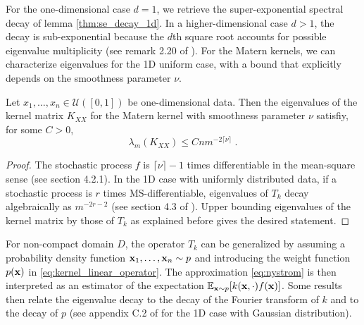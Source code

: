 \documentclass{article}
\begin{document}
For the one-dimensional case $d=1$, we retrieve the super-exponential spectral decay of lemma \ref{thm:se_decay_1d}. In a higher-dimensional case $d>1$, the decay is sub-exponential because the $d$th square root accounts for possible eigenvalue multiplicity (see remark 2.20 of \cite{schwab_karhunenloeve_2006}).
For the Matern kernels, we can characterize eigenvalues for the 1D uniform case, with a bound that explicitly depends on the smoothness parameter $\nu$.


\begin{theorem} \label{thm:matern_1d_uniform}
Let $x_1, \ldots, x_n \in \mathcal U([0, 1])$ be one-dimensional data. Then the eigenvalues of the kernel matrix $K_{XX}$ for the Matern kernel with smoothness parameter $\nu$ satisfiy, for some $C > 0$,
\begin{equation*}
    \lambda_m(K_{XX}) \le C n m^{-2\lceil \nu \rceil} \; .
\end{equation*}
\end{theorem}
\begin{proof}
The stochastic process $f$ is $\lceil \nu \rceil -1$ times differentiable in the mean-square sense (see \cite{rasmussen_gaussian_2005} section 4.2.1). In the 1D case with uniformly distributed data, if a stochastic process is $r$ times MS-differentiable, eigenvalues of $T_k$  decay algebraically as $m^{-2r - 2}$ (see section 4.3 of \cite{rasmussen_gaussian_2005}). Upper bounding eigenvalues of the kernel matrix by those of $T_k$ as explained before gives the desired statement.
\end{proof}

For non-compact domain $D$, the operator $T_k$ can be generalized by assuming a probability density function $\boldsymbol{\mathbf{x}}_1, \ldots, \boldsymbol{\mathbf{x}}_n \sim p$ and introducing the weight function $p(\boldsymbol{\mathbf{x}})$ in \eqref{eq:kernel_linear_operator}. The approximation \eqref{eq:nystrom} is then interpreted as an estimator of the expectation $\operatorname{\mathbb{E}}_{\boldsymbol{\mathbf{x}} \sim p}[k(\boldsymbol{\mathbf{x}}, \cdot) f(\boldsymbol{\mathbf{x}})]$. Some results then relate the eigenvalue decay to the decay of the Fourier transform of $k$ and to the decay of $p$ (see appendix C.2 of \cite{bach_kernel_2002} for the 1D case with Gaussian distribution).
\end{document}
